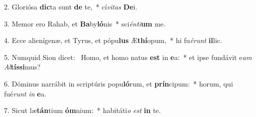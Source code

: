 2. Gloriósa \textbf{dic}ta sunt \textbf{de} te,~*  cí\textit{vi}\textit{tas} \textbf{De}i.\

3. Memor ero Rahab, et \textbf{Ba}by\textbf{ló}nis~*  sci\textit{én}\textit{ti}\textbf{um} me.\

4. Ecce alienígenæ, et Tyrus, et pópu\textbf{lus} Æ\textbf{thí}opum,~*  hi fu\textit{é}\textit{runt} \textbf{il}lic.\

5. Numquid Sion dicet: \dag\  Homo, et homo natus \textbf{est} in \textbf{e}a:~*  et ipse fundávit e\textit{am} \textit{Al}\textbf{tís}\textbf{si}mus?\

6. Dóminus narrábit in scriptúris popu\textbf{ló}rum, et \textbf{prín}cipum:~*  horum, qui fué\textit{runt} \textit{in} \textbf{e}a.\

7. Sicut læ\textbf{tán}tium \textbf{óm}nium:~*  habitáti\textit{o} \textit{est} \textbf{in} te.\

